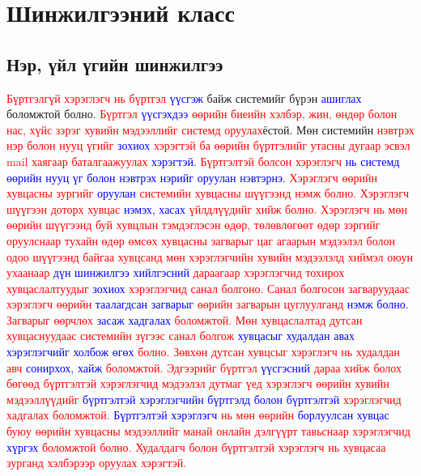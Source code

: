 \section{Шинжилгээний класс}
\subsection{Нэр, үйл үгийн шинжилгээ}

\par

\noindent\textcolor{red}{Бүртгэлгүй хэрэглэгч нь бүртгэл} \textcolor{blue}{үүсгэж} байж системийг бүрэн \textcolor{blue}{ашиглах} боломжтой болно. \textcolor{red}{Бүртгэл} \textcolor{blue}{үүсгэхдээ} \textcolor{red}{өөрийн биеийн хэлбэр, жин, өндөр болон нас, хүйс зэрэг хувийн мэдээллийг системд оруулах}ёстой. Мөн системийн\textcolor{red}{ нэвтрэх нэр болон нууц үгийг} \textcolor{blue}{зохиох} \textcolor{red}{хэрэгтэй ба өөрийн бүртгэлийг утасны дугаар эсвэл mail хаягаар баталгаажуулах} \textcolor{blue}{хэрэгтэй.} \textcolor{red}{Бүртгэлтэй болсон хэрэглэгч} \textcolor{blue}{нь системд өөрийн нууц үг болон нэвтрэх нэрийг оруулан нэвтэрнэ.} \textcolor{red}{Хэрэглэгч өөрийн хувцасны зургийг} \textcolor{blue}{оруулан} \textcolor{red}{системийн хувцасны шүүгээнд нэмж болно.} \textcolor{red}{Хэрэглэгч шүүгээн доторх хувцас} \textcolor{blue}{нэмэх, хасах} \textcolor{red}{үйлдлүүдийг хийж болно.} \textcolor{red}{Хэрэглэгч нь мөн өөрийн шүүгээнд буй хувцлын тэмдэглэсэн өдөр, төлөвлөгөөт өдөр зэргийг оруулснаар тухайн өдөр өмсөх хувцасны загварыг цаг агаарын мэдээлэл болон одоо шүүгээнд байгаа хувцсанд мөн хэрэглэгчийн хувийн мэдээлэлд хиймэл оюун ухаанаар} \textcolor{blue}{дүн шинжилгээ хийлгэсний} \textcolor{red}{дараагаар хэрэглэгчид тохирох хувцаслалтуудыг} \textcolor{blue}{зохиох} \textcolor{red}{хэрэглэгчид санал болгоно.} \textcolor{red}{Санал болгосон загваруудаас хэрэглэгч өөрийн} \textcolor{blue}{таалагдсан загварыг} \textcolor{red}{өөрийн загварын цуглуулганд} \textcolor{blue}{нэмж болно.} \textcolor{red}{Загварыг өөрчлөх} \textcolor{blue}{засаж хадгалах} \textcolor{red}{боломжтой.} \textcolor{red}{Мөн хувцаслалтад дутсан хувцаснуудаас системийн зүгээс санал болгож} \textcolor{blue}{хувцасыг худалдан авах хэрэглэгчийг холбож өгөх} \textcolor{red}{болно.} \textcolor{red}{Зөвхөн дутсан хувцсыг хэрэглэгч нь худалдан авч} \textcolor{blue}{сонирхох, хайж} \textcolor{red}{боломжтой.} \textcolor{red}{Эдгээрийг бүртгэл} \textcolor{blue}{үүсгэсний} \textcolor{red}{дараа хийж болох бөгөөд бүртгэлтэй хэрэглэгчид мэдээлэл дутмаг үед} \textcolor{red}{хэрэглэгч өөрийн хувийн мэдээллүүдийг} \textcolor{blue}{бүртгэлтэй хэрэглэгчийн бүртгэлд болон бүртгэлтэй} \textcolor{red}{хэрэглэгчид хадгалах боломжтой.} \textcolor{blue}{Бүртгэлтэй хэрэглэгч} \textcolor{red}{нь мөн өөрийн} \textcolor{blue}{борлуулсан хувцас} \textcolor{red}{буюу өөрийн хувцасны мэдээллийг манай онлайн дэлгүүрт тавьснаар хэрэглэгчид} \textcolor{blue}{хүргэх} \textcolor{red}{боломжтой болно.} \textcolor{red}{Худалдагч болон бүртгэлтэй хэрэглэгч нь хувцасаа зурганд хэлбэрээр оруулах хэрэгтэй.}
